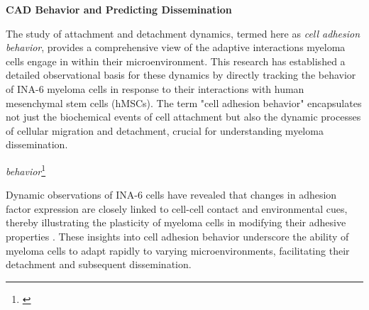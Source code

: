 \textbf{\acf{CAD} Behavior and Predicting Dissemination}


The study of attachment and detachment dynamics, termed here as \textit{cell
      adhesion behavior}, provides a comprehensive view of the adaptive interactions
myeloma cells engage in within their microenvironment. This research has
established a detailed observational basis for these dynamics by directly
tracking the behavior of INA-6 myeloma cells in response to their interactions
with human mesenchymal stem cells (hMSCs). The term "cell adhesion behavior"
encapsulates not just the biochemical events of cell attachment but also the
dynamic processes of cellular migration and detachment, crucial for
understanding myeloma dissemination.

\emph{behavior}\footnote{\footattachdetachbehaviour\label{foot:attachdetach_behaviour}}

Dynamic observations of INA-6 cells have revealed that changes in adhesion
factor expression are closely linked to cell-cell contact and environmental
cues, thereby illustrating the plasticity of myeloma cells in modifying their
adhesive properties \cite{huDevelopmentCellAdhesionbased2024,
      mrozikTherapeuticTargetingNcadherin2015}. These insights into cell adhesion
behavior underscore the ability of myeloma cells to adapt rapidly to varying
microenvironments, facilitating their detachment and subsequent dissemination.

